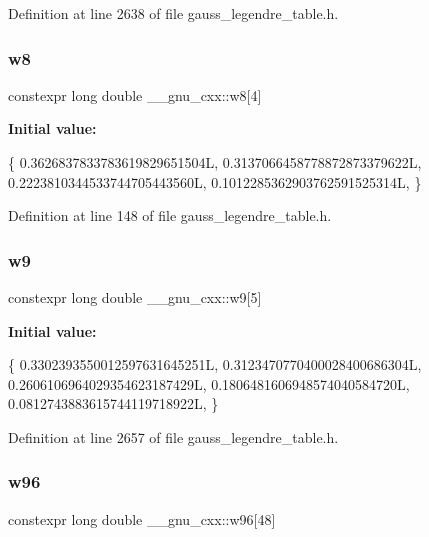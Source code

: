 Definition at line 2638 of file gauss\+\_\+legendre\+\_\+table.\+h.

\mbox{\label{namespace____gnu__cxx_a64ce9fc76f8b3570a3e67468e028c380}} 
\subsubsection{\texorpdfstring{w8}{w8}}
{\footnotesize\ttfamily constexpr long double \+\_\+\+\_\+gnu\+\_\+cxx\+::w8\mbox{[}4\mbox{]}}

{\bfseries Initial value\+:}
\begin{DoxyCode}
\{
    0.3626837833783619829651504L,
    0.3137066458778872873379622L,
    0.2223810344533744705443560L,
    0.1012285362903762591525314L,
  \}
\end{DoxyCode}


Definition at line 148 of file gauss\+\_\+legendre\+\_\+table.\+h.

\mbox{\label{namespace____gnu__cxx_abd928434475ecfea20ea0fa4b9d65871}} 
\subsubsection{\texorpdfstring{w9}{w9}}
{\footnotesize\ttfamily constexpr long double \+\_\+\+\_\+gnu\+\_\+cxx\+::w9\mbox{[}5\mbox{]}}

{\bfseries Initial value\+:}
\begin{DoxyCode}
\{
    0.3302393550012597631645251L,
    0.3123470770400028400686304L,
    0.2606106964029354623187429L,
    0.1806481606948574040584720L,
    0.0812743883615744119718922L,
  \}
\end{DoxyCode}


Definition at line 2657 of file gauss\+\_\+legendre\+\_\+table.\+h.

\mbox{\label{namespace____gnu__cxx_a6cffee1d5cee8b67c34551ed5692d5c6}} 
\subsubsection{\texorpdfstring{w96}{w96}}
{\footnotesize\ttfamily constexpr long double \+\_\+\+\_\+gnu\+\_\+cxx\+::w96\mbox{[}48\mbox{]}}



